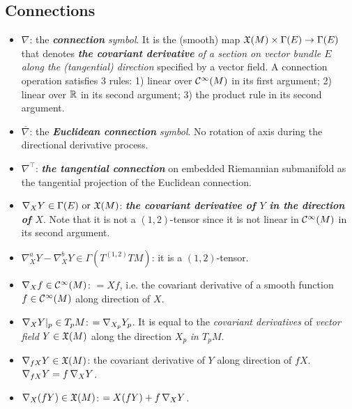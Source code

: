 \documentclass[11pt]{article}
\begin{document}
\subsection{Connections}
\begin{itemize}
\item $\nabla$: \quad the \emph{\textbf{connection} symbol}. It is the (smooth) map ${\mathfrak X}(M) \times \Gamma(E) \rightarrow \Gamma(E)$ that denotes \emph{\textbf{the covariant derivative} of a section on vector bundle $E$ along the (tangential) direction} specified by a vector field. A connection operation satisfies 3 rules: 1) linear over ${\mathcal C}^{\infty}(M)$ in its first argument; 2) linear over ${\mathbb R}$ in its second argument; 3) the product rule in its second argument.

\item $\overline{\nabla}$: \quad the \emph{\textbf{Euclidean connection} symbol}. No rotation of axis during the directional derivative process.  

\item $\nabla^{\top}$: \quad \emph{\textbf{the tangential connection}} on  embedded Riemannian submanifold as the tangential projection of the Euclidean connection.

\item $\nabla_{X}{Y}\in \Gamma(E) \text{ or } {\mathfrak X}(M)$: \quad \emph{\textbf{the covariant derivative of $Y$ in the direction of $X$}}. Note that it is not a $(1, 2)$-tensor since it is not linear in ${\mathcal C}^{\infty}(M)$ in its second argument.

\item $\nabla^a_{X}{Y} - \nabla^b_{X}{Y} \in \Gamma(T^{(1,2)}TM)$: \quad it is a $(1, 2)$-tensor.

\item $\nabla_{X}{f} \in {\mathcal C}^{\infty}(M)$: \quad $= Xf$, i.e. the covariant derivative of  a smooth function $f \in {\mathcal C}^{\infty}(M)$ along direction of $X$.

\item $\nabla_{X}{Y}|_{p} \in T_pM$: \quad $= \nabla_{X_p}{Y_p}$. It is equal to the \emph{covariant derivatives} of \emph{vector field} $Y \in {\mathfrak X}(M)$ along the direction $X_p$ \emph{in $T_pM$}.

\item $\nabla_{fX}{Y} \in {\mathfrak X}(M)$: \quad  the covariant derivative of $Y$ along direction of $fX$. $\nabla_{fX}{Y} =f\,\nabla_{X}{Y}$.

\item $\nabla_{X}{(fY)} \in {\mathfrak X}(M)$: \quad $=X(fY) + f\,\nabla_{X}{Y}$.


\end{itemize}
\end{document}
